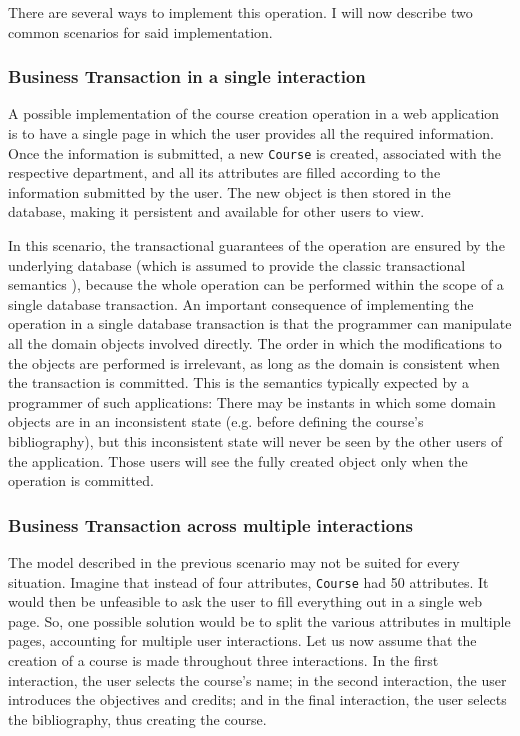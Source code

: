 \documentclass{llncs}
\begin{document}
There are several ways to implement this operation. I will now
describe two common scenarios for said implementation.

\subsubsection{Business Transaction in a single interaction}

A possible implementation of the course creation operation in a web
application is to have a single page in which the user provides all
the required information. Once the information is submitted, a new
\texttt{Course} is created, associated with the respective department,
and all its attributes are filled according to the information
submitted by the user. The new object is then stored in the database,
making it persistent and available for other users to view.

In this scenario, the transactional guarantees of the operation are
ensured by the underlying database (which is assumed to provide the
classic transactional semantics \cite{gray1981transaction}), because
the whole operation can be performed within the scope of a single
database transaction. An important consequence of implementing the
operation in a single database transaction is that the programmer can
manipulate all the domain objects involved directly. The order in
which the modifications to the objects are performed is irrelevant, as
long as the domain is consistent when the transaction is
committed. This is the semantics typically expected by a programmer of
such applications: There may be instants in which some domain objects
are in an inconsistent state (e.g. before defining the course's
bibliography), but this inconsistent state will never be seen by the
other users of the application. Those users will see the fully created
object only when the operation is committed.

\subsubsection{Business Transaction across multiple interactions}

The model described in the previous scenario may not be suited for
every situation. Imagine that instead of four attributes,
\texttt{Course} had 50 attributes. It would then be unfeasible to ask
the user to fill everything out in a single web page. So, one possible
solution would be to split the various attributes in multiple pages,
accounting for multiple user interactions. Let us now assume that the
creation of a course is made throughout three interactions. In the
first interaction, the user selects the course's name; in the second
interaction, the user introduces the objectives and credits; and in
the final interaction, the user selects the bibliography, thus
creating the course.
\end{document}
